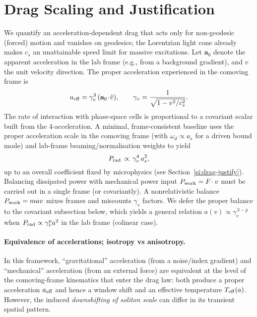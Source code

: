 \documentclass[11pt]{article}
\begin{document}
\section{Drag Scaling and Justification}\label{si:drag}
We quantify an acceleration-dependent drag that acts only for non-geodesic (forced) motion and vanishes on geodesics; the Lorentzian light cone already makes $c_s$ an unattainable speed limit for massive excitations. Let $\mathbf a_0$ denote the apparent acceleration in the lab frame (e.g., from a background gradient), and $\hat v$ the unit velocity direction. The proper acceleration experienced in the comoving frame is
\begin{equation}
  a_{\rm eff} = \gamma_v^{3}\, (\mathbf a_0\!\cdot\!\hat v),\qquad \gamma_v=\frac{1}{\sqrt{1-v^2/c_s^2}}.
\end{equation}
The rate of interaction with phase-space cells is proportional to a covariant scalar built from the 4-acceleration. A minimal, frame-consistent baseline uses the proper acceleration scale in the comoving frame (with $\omega_d\propto a_s$ for a driven bound mode) and lab-frame beaming/normalisation weights to yield
\begin{equation}
  P_{\rm rad} \,\propto\, \gamma_v^{4}\, a_s^{2},
\end{equation}
up to an overall coefficient fixed by microphysics (see Section~\ref{si:drag-justify}).
Balancing dissipated power with mechanical power input $P_{\rm work}=F\!\cdot v$ must be carried out in a single frame (or covariantly). A nonrelativistic balance $P_{\rm work}=m a v$ mixes frames and miscounts $\gamma_v$ factors. We defer the proper balance to the covariant subsection below, which yields a general relation $a(v)\propto \gamma_v^{\,3-p}$ when $P_{\rm rad}\propto \gamma_v^{p} a^2$ in the lab frame (colinear case).

\paragraph{Equivalence of accelerations; isotropy vs anisotropy.} In this framework, ``gravitational'' acceleration (from a noise/index gradient) and ``mechanical'' acceleration (from an external force) are equivalent at the level of the comoving-frame kinematics that enter the drag law: both produce a proper acceleration $a_{\rm eff}$ and hence a window shift and an effective temperature $T_{\rm eff}(a)$. However, the induced \emph{downshifting of soliton scale} can differ in its transient spatial pattern.
\end{document}
